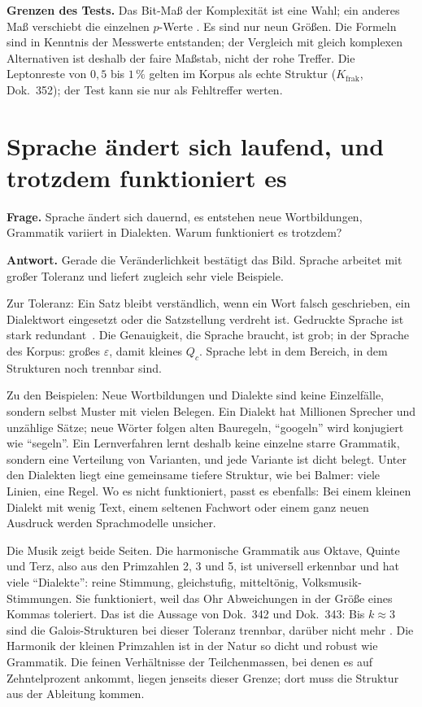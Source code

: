 \textbf{Grenzen des Tests.} Das Bit-Maß der Komplexität ist eine Wahl; ein anderes Maß verschiebt die
einzelnen $p$-Werte \SM. Es sind nur neun Größen. Die Formeln sind in Kenntnis der Messwerte
entstanden; der Vergleich mit gleich komplexen Alternativen ist deshalb der faire Maßstab, nicht der
rohe Treffer. Die Leptonreste von $0{,}5$ bis $1\,\%$ gelten im Korpus als echte Struktur
($K_{\mathrm{frak}}$, Dok.~352); der Test kann sie nur als Fehltreffer werten.

\section{Sprache ändert sich laufend, und trotzdem funktioniert es}

\textbf{Frage.} Sprache ändert sich dauernd, es entstehen neue Wortbildungen, Grammatik variiert in
Dialekten. Warum funktioniert es trotzdem?

\textbf{Antwort.} Gerade die Veränderlichkeit bestätigt das Bild. Sprache arbeitet mit großer
Toleranz und liefert zugleich sehr viele Beispiele.

Zur Toleranz: Ein Satz bleibt verständlich, wenn ein Wort falsch geschrieben, ein Dialektwort
eingesetzt oder die Satzstellung verdreht ist. Gedruckte Sprache ist stark redundant
\QM\,\cite{Shannon1951}. Die Genauigkeit, die Sprache braucht, ist grob; in der Sprache des Korpus:
großes $\varepsilon$, damit kleines $Q_c$. Sprache lebt in dem Bereich, in dem Strukturen noch
trennbar sind.

Zu den Beispielen: Neue Wortbildungen und Dialekte sind keine Einzelfälle, sondern selbst Muster mit
vielen Belegen. Ein Dialekt hat Millionen Sprecher und unzählige Sätze; neue Wörter folgen alten
Bauregeln, \enquote{googeln} wird konjugiert wie \enquote{segeln}. Ein Lernverfahren lernt deshalb
keine einzelne starre Grammatik, sondern eine Verteilung von Varianten, und jede Variante ist dicht
belegt. Unter den Dialekten liegt eine gemeinsame tiefere Struktur, wie bei Balmer: viele Linien,
eine Regel. Wo es nicht funktioniert, passt es ebenfalls: Bei einem kleinen Dialekt mit wenig Text,
einem seltenen Fachwort oder einem ganz neuen Ausdruck werden Sprachmodelle unsicher.

Die Musik zeigt beide Seiten. Die harmonische Grammatik aus Oktave, Quinte und Terz, also aus den
Primzahlen 2, 3 und 5, ist universell erkennbar und hat viele \enquote{Dialekte}: reine Stimmung,
gleichstufig, mitteltönig, Volksmusik-Stimmungen. Sie funktioniert, weil das Ohr Abweichungen in der
Größe eines Kommas toleriert. Das ist die Aussage von Dok.~342 und Dok.~343: Bis $k\approx3$ sind die
Galois-Strukturen bei dieser Toleranz trennbar, darüber nicht mehr \BM. Die Harmonik der kleinen
Primzahlen ist in der Natur so dicht und robust wie Grammatik. Die feinen Verhältnisse der
Teilchenmassen, bei denen es auf Zehntelprozent ankommt, liegen jenseits dieser Grenze; dort muss die
Struktur aus der Ableitung kommen.

